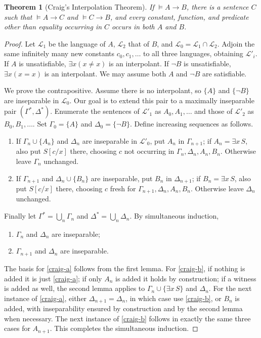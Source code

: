 \documentclass[UTF8,11pt]{ctexart}
\newtheorem*{theorem}{Theorem}
\theoremstyle{definition}
\begin{document}
\begin{theorem}[Craig's Interpolation Theorem]
If $\models A\to B$, there is a sentence $C$ such that
$\models A\to C$ and $\models C\to B$, and every constant, function,
and predicate other than equality occurring in $C$ occurs in both $A$
and $B$.
\end{theorem}
\begin{proof}
Let $\mathcal L_1$ be the language of $A$, $\mathcal L_2$ that of $B$,
and $\mathcal L_0=\mathcal L_1\cap\mathcal L_2$. Adjoin the same infinitely
many new constants $c_0,c_1,\ldots$ to all three languages, obtaining
$\mathcal L'_i$.
If $A$ is unsatisfiable, $\exists x(x\ne x)$ is an interpolant.
If $\neg B$ is unsatisfiable, $\exists x(x=x)$ is an interpolant.
We may assume both $A$ and $\neg B$ are satisfiable.

We prove the contrapositive. Assume there is no interpolant, so
$\{A\}$ and $\{\neg B\}$ are inseparable in $\mathcal L_0$.
Our goal is to extend this pair to a maximally inseparable pair
$(\Gamma^*,\Delta^*)$.
Enumerate the sentences of $\mathcal L'_1$ as $A_0,A_1,\ldots$ and those
of $\mathcal L'_2$ as $B_0,B_1,\ldots$.
Set $\Gamma_0=\{A\}$ and $\Delta_0=\{\neg B\}$.
Define increasing sequences as follows.
\begin{enumerate}
\item If $\Gamma_n\cup\{A_n\}$ and $\Delta_n$ are inseparable in
$\mathcal L'_0$, put $A_n$ in $\Gamma_{n+1}$; if $A_n=\exists x\,S$,
also put $S[c/x]$ there, choosing $c$ not occurring in
$\Gamma_n,\Delta_n,A_n,B_n$. Otherwise leave $\Gamma_n$ unchanged.
\item If $\Gamma_{n+1}$ and $\Delta_n\cup\{B_n\}$ are inseparable,
put $B_n$ in $\Delta_{n+1}$; if $B_n=\exists x\,S$, also put
$S[c/x]$ there, choosing $c$ fresh for
$\Gamma_{n+1},\Delta_n,A_n,B_n$. Otherwise leave $\Delta_n$ unchanged.
\end{enumerate}
Finally let $\Gamma^*=\bigcup_n\Gamma_n$ and
$\Delta^*=\bigcup_n\Delta_n$.
By simultaneous induction,
\begin{enumerate}[label=(\alph*)]
\item\label{craig-a} $\Gamma_n$ and $\Delta_n$ are inseparable;
\item\label{craig-b} $\Gamma_{n+1}$ and $\Delta_n$ are inseparable.
\end{enumerate}
The basis for \ref{craig-a} follows from the first lemma. For
\ref{craig-b}, if nothing is added it is just \ref{craig-a}; if only
$A_n$ is added it holds by construction; if a witness is added as well,
the second lemma applies to $\Gamma_n\cup\{\exists x\,S\}$ and $\Delta_n$.
For the next instance of \ref{craig-a}, either $\Delta_{n+1}=\Delta_n$,
in which case use \ref{craig-b}, or $B_n$ is added, with inseparability
ensured by construction and by the second lemma when necessary.
The next instance of \ref{craig-b} follows in exactly the same three
cases for $A_{n+1}$. This completes the simultaneous induction.


\end{proof}
\end{document}
